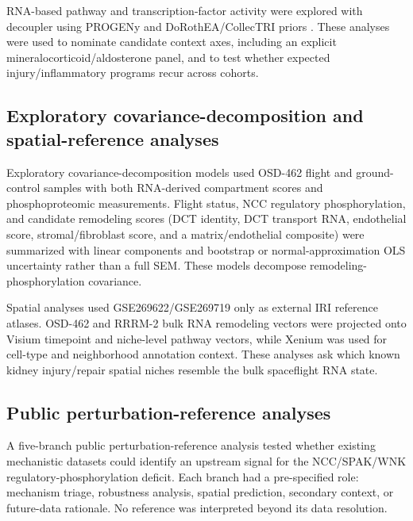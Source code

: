 \documentclass[11pt]{article}
\begin{document}
RNA-based pathway and transcription-factor activity were explored with decoupler using PROGENy and DoRothEA/CollecTRI priors \citep{badia2022decoupler,schubert2018progeny,garcia2019benchmark}. These analyses were used to nominate candidate context axes, including an explicit mineralocorticoid/aldosterone panel, and to test whether expected injury/inflammatory programs recur across cohorts.

\subsection{Exploratory covariance-decomposition and spatial-reference analyses}

Exploratory covariance-decomposition models used OSD-462 flight and ground-control samples with both RNA-derived compartment scores and phosphoproteomic measurements. Flight status, NCC regulatory phosphorylation, and candidate remodeling scores (DCT identity, DCT transport RNA, endothelial score, stromal/fibroblast score, and a matrix/endothelial composite) were summarized with linear components and bootstrap or normal-approximation OLS uncertainty rather than a full SEM. These models decompose remodeling-phosphorylation covariance.

Spatial analyses used GSE269622/GSE269719 only as external IRI reference atlases. OSD-462 and RRRM-2 bulk RNA remodeling vectors were projected onto Visium timepoint and niche-level pathway vectors, while Xenium was used for cell-type and neighborhood annotation context. These analyses ask which known kidney injury/repair spatial niches resemble the bulk spaceflight RNA state.

\subsection{Public perturbation-reference analyses}

A five-branch public perturbation-reference analysis tested whether existing mechanistic datasets could identify an upstream signal for the NCC/SPAK/WNK regulatory-phosphorylation deficit. Each branch had a pre-specified role: mechanism triage, robustness analysis, spatial prediction, secondary context, or future-data rationale. No reference was interpreted beyond its data resolution.
\end{document}
